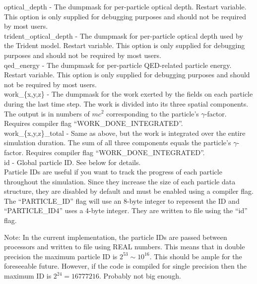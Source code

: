 {\emphtext optical\_depth} - The dumpmask for per-particle optical depth.
  Restart variable. This option is only supplied for debugging purposes and
  should not be required by most users.\\

{\emphtext trident\_optical\_depth} - The dumpmask for per-particle optical
  depth used by the Trident model.
  Restart variable. This option is only supplied for debugging purposes and
  should not be required by most users.\\

{\emphtext qed\_energy} - The dumpmask for per-particle QED-related particle
  energy.
  Restart variable. This option is only supplied for debugging purposes and
  should not be required by most users.\\

{\emphtext work\_\{x,y,z\}} - The dumpmask for the work exerted by the
  fields on each particle during the last time step. The work is divided into
  its three spatial components. The output is in numbers of $mc^2$ corresponding
  to the particle's $\gamma$-factor. Requires compiler flag
  ``WORK\_DONE\_INTEGRATED''.\\

{\emphtext work\_\{x,y,z\}\_total} - Same as above,
  but the work is integrated over the entire simulation duration. The sum of all
  three components equals the particle's $\gamma$-factor. Requires compiler
  flag ``WORK\_DONE\_INTEGRATED''.\\

{\emphtext id} - Global particle ID. See below for details.\\

Particle IDs are useful if you want to track the progress
of each particle throughout the simulation. Since they increase
the size of each particle data structure, they are disabled by
default and must be enabled using a compiler flag.
The ``PARTICLE\_ID'' flag will use an 8-byte integer to represent the
ID and ``PARTICLE\_ID4'' uses a 4-byte integer.
They are written to file using the ``id'' flag.

Note: In the current implementation, the particle IDs are
passed between processors and written to file using REAL numbers.
This means that in double precision the maximum particle ID
is $2^{53} \sim 10^{16}$. This should be ample for the foreseeable future.
However, if the code is compiled for single precision then the
maximum ID is $2^{24} = 16777216$. Probably not big enough.

